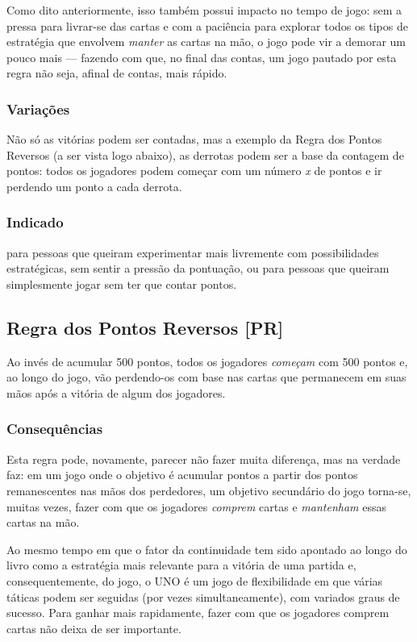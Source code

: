 Como dito anteriormente, isso também possui impacto no tempo de jogo: sem a pressa para livrar-se das cartas e com a paciência para explorar todos os tipos de estratégia que envolvem \textit{manter} as cartas na mão, o jogo pode vir a demorar um pouco mais --- fazendo com que, no final das contas, um jogo pautado por esta regra não seja, afinal de contas, mais rápido.

\subsubsection{Variações}

Não só as vitórias podem ser contadas, mas a exemplo da Regra dos Pontos Reversos (a ser vista logo abaixo), as derrotas podem ser a base da contagem de pontos: todos os jogadores podem começar com um número \emph{x} de pontos e ir perdendo um ponto a cada derrota. 

\subsubsection{Indicado}

para pessoas que queiram experimentar mais livremente com possibilidades estratégicas, sem sentir a pressão da pontuação, ou para pessoas que queiram simplesmente jogar sem ter que contar pontos.

\subsection{Regra dos Pontos Reversos [PR]}

\label{pontosreversos}

Ao invés de acumular 500 pontos, todos os jogadores \textit{começam} com 500 pontos e, ao longo do jogo, vão perdendo-os com base nas cartas que permanecem em suas mãos após a vitória de algum dos jogadores.

\subsubsection{Consequências}

Esta regra pode, novamente, parecer não fazer muita diferença, mas na verdade faz: em um jogo onde o objetivo é acumular pontos a partir dos pontos remanescentes nas mãos dos perdedores, um objetivo secundário do jogo torna-se, muitas vezes, fazer com que os jogadores \textit{comprem} cartas e \textit{mantenham} essas cartas na mão.

Ao mesmo tempo em que o fator da continuidade tem sido apontado ao longo do livro como a estratégia mais relevante para a vitória de uma partida e, consequentemente, do jogo, o UNO é um jogo de flexibilidade em que várias táticas podem ser seguidas (por vezes simultaneamente), com variados graus de sucesso. Para ganhar mais rapidamente, fazer com que os jogadores comprem cartas não deixa de ser importante.

